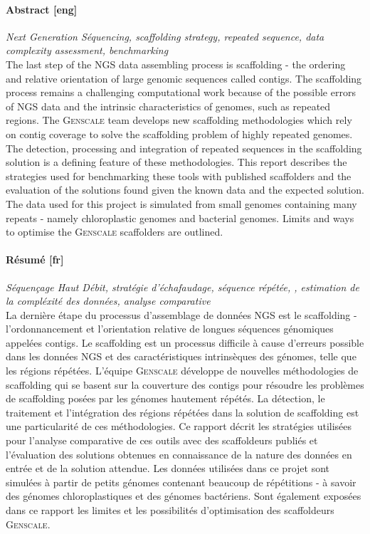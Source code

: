 \documentclass[12pt]{article}
\begin{document}
\paragraph*{Abstract [eng]} \textit{Next Generation Séquencing, scaffolding strategy, repeated sequence, data complexity assessment, benchmarking} \\
The last step of the NGS data assembling process is scaffolding - the ordering and relative orientation of large genomic sequences called contigs. The scaffolding process remains a challenging computational work because of the possible errors of NGS data and the intrinsic characteristics of genomes, such as repeated regions. The \textsc{Genscale} team develops new scaffolding methodologies which rely on contig coverage to solve the scaffolding problem of highly repeated genomes. The detection, processing and integration of repeated sequences in the scaffolding solution is a defining feature of these methodologies. This report describes the strategies used for benchmarking these tools with published scaffolders and the evaluation of the solutions found given the known data and the expected solution. The data used for this project is simulated from small genomes containing many repeats - namely chloroplastic genomes and bacterial genomes. Limits and ways to optimise the \textsc{Genscale} scaffolders are outlined.

\vspace*{0.5cm}
\paragraph*{Résumé [fr]} \textit{Séquençage Haut Débit, stratégie d'échafaudage, séquence répétée, , estimation de la compléxité des données, analyse comparative}\\
La dernière étape du processus d'assemblage de données NGS est le scaffolding - l'ordonnancement et l'orientation relative de longues séquences génomiques appelées contigs. Le scaffolding est un processus difficile à cause d'erreurs possible dans les données NGS et des caractéristiques intrinsèques des génomes, telle que les régions répétées. L’équipe \textsc{Genscale} développe de nouvelles méthodologies de scaffolding qui se basent sur la couverture des contigs pour résoudre les problèmes de scaffolding posées par les génomes hautement répétés. La détection, le traitement et l'intégration des régions répétées dans la solution de scaffolding est une particularité de ces méthodologies. Ce rapport décrit les stratégies utilisées pour l'analyse comparative de ces outils avec des scaffoldeurs publiés et l'évaluation des solutions obtenues en connaissance de la nature des données en entrée et de la solution attendue. Les données utilisées dans ce projet sont simulées à partir de petits génomes contenant beaucoup de répétitions - à savoir des génomes chloroplastiques et des génomes bactériens. Sont également exposées dans ce rapport les limites et les possibilités d'optimisation des scaffoldeurs \textsc{Genscale}.
\end{document}
